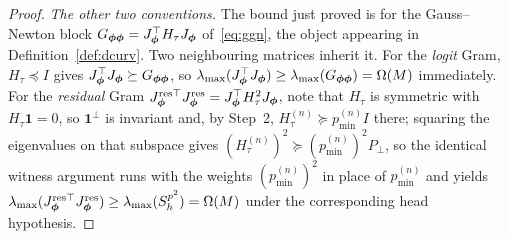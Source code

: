 \begin{proof}
\emph{The other two conventions.}
The bound just proved is for the Gauss--Newton block
$G_{{\boldsymbol{\phi}}{\boldsymbol{\phi}}} = J_{\boldsymbol{\phi}}^\top H_\tau J_{\boldsymbol{\phi}}$ of~\eqref{eq:ggn}, the object
appearing in Definition~\ref{def:dcurv}. Two neighbouring matrices inherit
it. For the \emph{logit} Gram, $H_\tau \preceq I$ gives
$J_{\boldsymbol{\phi}}^\top J_{\boldsymbol{\phi}} \succeq G_{{\boldsymbol{\phi}}{\boldsymbol{\phi}}}$, so
$\lambda_{\max}(J_{\boldsymbol{\phi}}^\top J_{\boldsymbol{\phi}}) \geq \lambda_{\max}(G_{{\boldsymbol{\phi}}{\boldsymbol{\phi}}}) =
\Omega(M)$ immediately. For the \emph{residual} Gram
$J_{\boldsymbol{\phi}}^{\mathrm{res}\top} J_{\boldsymbol{\phi}}^{\mathrm{res}} = J_{\boldsymbol{\phi}}^\top H_\tau^2
J_{\boldsymbol{\phi}}$, note that $H_\tau$ is symmetric with $H_\tau \mathbf{1} = 0$, so
$\mathbf{1}^\perp$ is invariant and, by Step~2,
$H_\tau^{(n)} \succeq p^{(n)}_{\min} I$ there; squaring the eigenvalues on
that subspace gives $(H_\tau^{(n)})^2 \succeq (p^{(n)}_{\min})^2 P_\perp$,
so the identical witness argument runs with the weights
$(p^{(n)}_{\min})^2$ in place of $p^{(n)}_{\min}$ and yields
$\lambda_{\max}(J_{\boldsymbol{\phi}}^{\mathrm{res}\top} J_{\boldsymbol{\phi}}^{\mathrm{res}}) \geq
\lambda_{\max}(S_h^{p^2}) = \Omega(M)$ under the corresponding head
hypothesis.
\end{proof}

